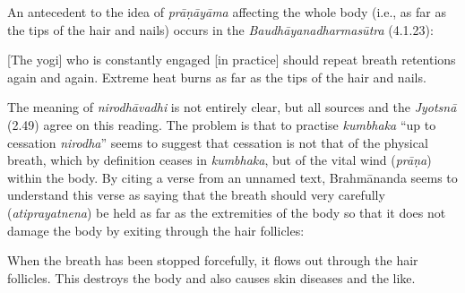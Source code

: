 \begin{ekdosis}
\begin{philcomm}[hp02_049]

An antecedent to the idea of \emph{prāṇāyāma} affecting the whole body (i.e., as far as the tips of the hair and nails) occurs in the \emph{Baudhāyanadharmasūtra} (4.1.23):

\begin{versinnote}
{}[The yogi] who is constantly engaged [in practice] should repeat breath retentions again and again. Extreme heat burns as far as the tips of the hair and nails. 
\end{versinnote}

\begin{versinnote}
\end{versinnote}

The meaning of \emph{nirodhāvadhi} is not entirely clear, but all sources and the \emph{Jyotsnā} (2.49) agree on this reading. The problem is that to practise \emph{kumbhaka} ``up to cessation \emph{nirodha}'' seems to suggest that cessation is not that of the physical breath, which by definition ceases in \emph{kumbhaka}, but of the vital wind (\emph{prāṇa}) within the body. By citing a verse from an unnamed text, Brahmānanda seems to understand this verse as saying that the breath should very carefully (\emph{atiprayatnena}) be held as far as the extremities of the body so that it does not damage the body by exiting through the hair follicles:


\begin{versinnote}
When the breath has been stopped forcefully, it flows out through the hair follicles. This destroys the body and also causes skin diseases and the like.
\end{versinnote}

\begin{versinnote}
%
\end{versinnote}
\end{philcomm}


\end{ekdosis}
